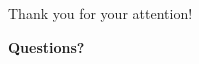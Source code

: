 \documentclass[11pt,compress,t,notes=noshow, aspectratio=169, xcolor=table]{beamer}
\begin{document}
\begin{frame}
  \centering
  \Large{Thank you for your attention!}
  \vspace{1cm}
  
  \normalsize
  \textbf{Questions?}
\end{frame}

% 
% 
\end{document}

